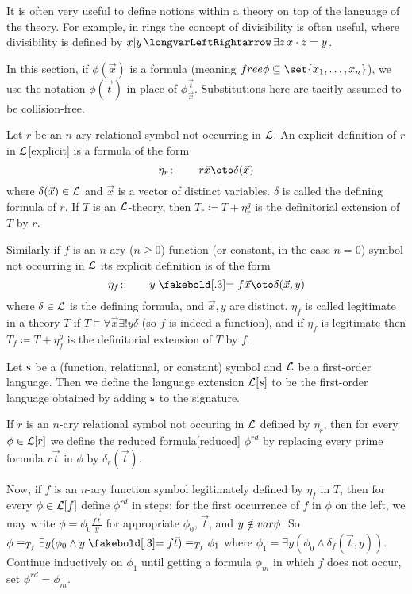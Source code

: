 It is often very useful to define notions within a theory on top of the language of the theory.
For example, in rings the concept of divisibility is often useful, where divisibility is defined by $x\divides y\iff\exists z\,x\cdot z=y$.

In this section, if $\phi(\vec x)$ is a formula (meaning $\free\phi\subseteq\set{x_1,\dots,x_n}$), we use the notation $\phi(\vec t)$ in place of $\phi\frac{\vec t}{\vec x}$.
Substitutions here are tacitly assumed to be collision-free.

\bdefn

    Let $r$ be an $n$-ary relational symbol not occurring in ${\cal L}$.
    An {\emphcolor explicit definition of $r$ in ${\cal L}$}[explicit] is a formula of the form
    $$ \eta_r\colon\qquad r\vec x\oto\delta(\vec x) $$
    where $\delta(\vec x)\in{\cal L}$ and $\vec x$ is a vector of distinct variables.
    $\delta$ is called the {\emphcolor defining formula of $r$}.
    If $T$ is an ${\cal L}$-theory, then $T_r\coloneqq T+\eta_r^g$ is the {\emphcolor definitorial extension} of $T$ by $r$.

    Similarly if $f$ is an $n$-ary ($n\geq0$) function (or constant, in the case $n=0$) symbol not occurring in ${\cal L}$ its explicit definition is of the form
    $$ \eta_f\colon\qquad y\eq f\vec x\oto\delta(\vec x,y) $$
    where $\delta\in{\cal L}$ is the defining formula, and $\vec x,y$ are distinct.
    $\eta_f$ is called {\emphcolor legitimate} in a theory $T$ if $T\vDash\forall\vec x\exists!y\delta$ (so $f$ is indeed a function), and if $\eta_f$ is legitimate then $T_f\coloneqq T+\eta_f^g$ is the
    definitorial extension of $T$ by $f$.

\edefn

\bdefn

    Let ${\sf s}$ be a (function, relational, or constant) symbol and ${\cal L}$ be a first-order language.
    Then we define the {\emphcolor language extension} ${\cal L}[s]$ to be the first-order language obtained by adding ${\sf s}$ to the signature.

    If $r$ is an $n$-ary relational symbol not occuring in ${\cal L}$ defined by $\eta_r$, then for every $\phi\in{\cal L}[r]$ we define the {\emphcolor reduced formula}[reduced]
    $\phi^{rd}$ by replacing every prime formula $r\vec t$ in $\phi$ by $\delta_r(\vec t)$.

    Now, if $f$ is an $n$-ary function symbol legitimately defined by $\eta_f$ in $T$, then for every $\phi\in{\cal L}[f]$ define $\phi^{rd}$ in steps: for the first occurrence of $f$ in $\phi$ on the left,
    we may write $\phi=\phi_0\frac{f\vec t}y$ for appropriate $\phi_0$, $\vec t$, and $y\notin{\sl var}\phi$.
    So $\phi\equiv_{T_f}\exists y(\phi_0\land y\eq f\vec t)\equiv_{T_f}\phi_1$ where $\phi_1=\exists y(\phi_0\land\delta_f(\vec t,y))$.
    Continue inductively on $\phi_1$ until getting a formula $\phi_m$ in which $f$ does not occur, set $\phi^{rd}=\phi_m$.

